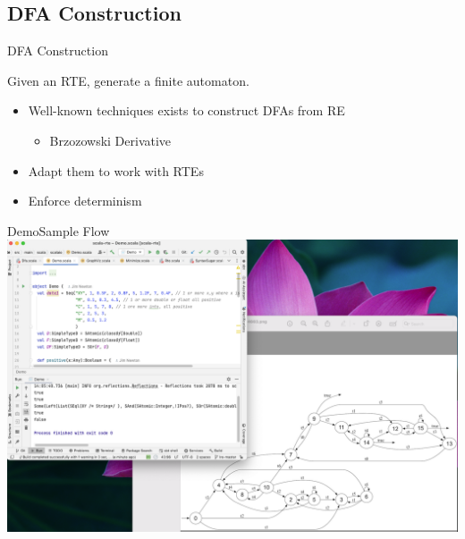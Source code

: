 \subsection{DFA Construction}

{  
\begin{frame}{ DFA Construction}

  Given an RTE, generate a finite automaton.

  \begin{itemize}
  \item Well-known techniques exists to construct DFAs from RE
    \begin{itemize}
      \item Brzozowski Derivative
  \end{itemize}
  \item Adapt them to work with RTEs
  \item Enforce determinism
  \end{itemize}
\end{frame}

}






\begin{frame}{Demo}{Sample Flow}
  \centering
   \includegraphics[height=0.8\textheight]{demo.png}
\end{frame}


